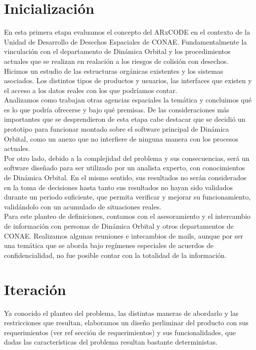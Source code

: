 \section{Inicializaci\'on}
En esta primera etapa evaluamos  el concepto del ARxCODE en el contexto de la Unidad de Desarrollo de Desechos Espaciales de CONAE. Fundamentalmente la vinculaci\'on con el departamento de Din\'amica Orbital y los procedimientos actuales que se realizan en realaci\'on a los riesgos de colisi\'on con desechos. Hicimos un estudio de las estructuras org\'anicas existentes y los sistemas asociados. Los distintos tipos de productos y usuarios, las interfaces que existen y el acceso a los datos reales con los que podr\'iamos contar.\\
Analizamos como trabajan otras agencias espaciales la tem\'atica y concluimos qu\'e es lo que podr\'ia ofrecerse y bajo qu\'e premisas.
De las consideraciones m\'as importantes que se desprendieron de esta etapa cabe destacar que se decidi\'o un prototipo para funcionar montado sobre el software principal de Din\'amica Orbital, como un anexo que no interfiere de ninguna manera con los procesos actuales.\\
Por otro lado, debido a la complejidad del problema y sus consecuencias, ser\'a un software diseñado para ser utilizado por un analista experto, con conocimientos de Din\'amica Orbital. En el mismo sentido, sus resultados no ser\'an considerados en la toma de decisiones hasta tanto sus resultados no hayan sido validados durante un periodo suficiente, que permita verificar y mejorar su funcionamiento, valid\'andolo con un acumulado de situaciones reales.\\
Para este planteo de definiciones, contamos con el asesoramiento y el intercambio de informaci\'on con personas de Din\'amica Orbital y otros departamentos de CONAE. Realizamos algunas reuniones e intecambios de mails, aunque por ser una tem\'atica que se aborda bajo reg\'imenes especiales de acuerdos de confidencialidad, no fue posible contar con la totalidad de la informaci\'on.

\section{Iteraci\'on}
Ya conocido el planteo del problema, las distintas maneras de abordarlo y las restricciones que resultan, elaboramos un diseño perliminar del producto con sus requerimientos (ver ref secci\'on de requerimientos) y sus funcionalidades, que dadas las caracter\'isticas del problema resultan bastante deterministas.\\

